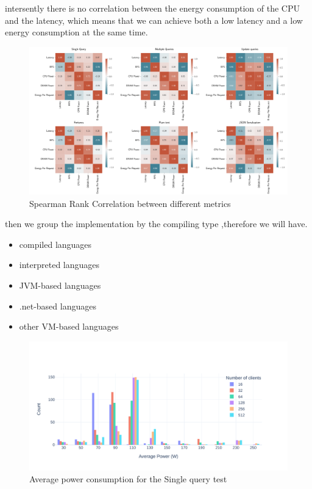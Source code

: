intersently there is no correlation between the energy consumption of the CPU and the latency, which means that we can achieve both a low latency and a low energy consumption at the same time. 
\begin{figure}[bht]
    \centering
    \includegraphics[width=.8\columnwidth ]{imgs/correlation_all}
    \caption{Spearman Rank Correlation between different metrics}
    \label{fig:correlation}
\end{figure}


then we group the implementation by the compiling type ,therefore we will have.
\begin{itemize}
    \item compiled languages 
    \item interpreted languages
    \item JVM-based languages 
    \item .net-based languages
    \item other VM-based languages
\end{itemize}


\begin{figure}[bht]
    \centering
    \caption{Average power consumption for the Single query test}
    \label{fig:av_power_db}
    \includegraphics[width=.8\columnwidth]{imgs/av_power_db}

\end{figure}


